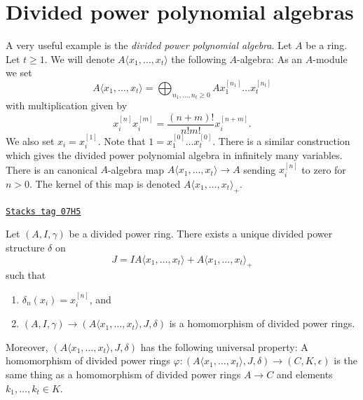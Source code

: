 \section{Divided power polynomial algebras}
\label{dpa-section-divided-power-polynomial-ring}
A very useful example is the {\it divided power polynomial algebra}.
Let $A$ be a ring. Let $t \geq 1$. We will denote
$A\langle x_1, \ldots, x_t \rangle$ the following $A$-algebra:
As an $A$-module we set
$$
A\langle x_1, \ldots, x_t \rangle =
\bigoplus\nolimits_{n_1, \ldots, n_t \geq 0} A x_1^{[n_1]} \ldots x_t^{[n_t]}
$$
with multiplication given by
$$
x_i^{[n]}x_i^{[m]} = \frac{(n + m)!}{n!m!}x_i^{[n + m]}.
$$
We also set $x_i = x_i^{[1]}$. Note that
$1 = x_1^{[0]} \ldots x_t^{[0]}$. There is a similar construction
which gives the divided power polynomial algebra in infinitely many
variables. There is an canonical $A$-algebra map
$A\langle x_1, \ldots, x_t \rangle \to A$ sending $x_i^{[n]}$ to zero
for $n > 0$. The kernel of this map is denoted
$A\langle x_1, \ldots, x_t \rangle_{+}$.

\begin{lemma}
\label{dpa-lemma-divided-power-polynomial-algebra}
\href{https://stacks.math.columbia.edu/tag/07H5}{\texttt{Stacks tag 07H5}}

Let $(A, I, \gamma)$ be a divided power ring.
There exists a unique divided power structure $\delta$ on
$$
J = IA\langle x_1, \ldots, x_t \rangle + A\langle x_1, \ldots, x_t \rangle_{+}
$$
such that
\begin{enumerate}
\item $\delta_n(x_i) = x_i^{[n]}$, and
\item $(A, I, \gamma) \to (A\langle x_1, \ldots, x_t \rangle, J, \delta)$
is a homomorphism of divided power rings.
\end{enumerate}
Moreover, $(A\langle x_1, \ldots, x_t \rangle, J, \delta)$ has the
following universal property: A homomorphism of divided power rings
$\varphi : (A\langle x_1, \ldots, x_t \rangle, J, \delta) \to
(C, K, \epsilon)$ is
the same thing as a homomorphism of divided power rings
$A \to C$ and elements $k_1, \ldots, k_t \in K$.
\end{lemma}

